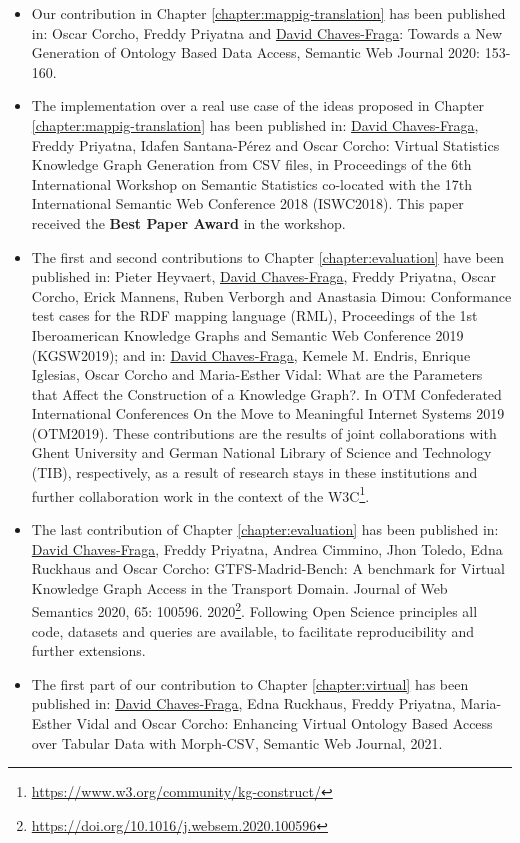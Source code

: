 \begin{itemize}
    \item Our contribution in Chapter \ref{chapter:mappig-translation} has been published in: Oscar Corcho, Freddy Priyatna and \underline{David Chaves-Fraga}: Towards a New Generation of Ontology Based Data Access, Semantic Web Journal 2020: 153-160.
    \item The implementation over a real use case of the ideas proposed in Chapter \ref{chapter:mappig-translation} has been published in: \underline{David Chaves-Fraga}, Freddy Priyatna, Idafen Santana-Pérez and Oscar Corcho: Virtual Statistics Knowledge Graph Generation from CSV files, in Proceedings of the 6th International Workshop on Semantic Statistics co-located with the 17th International Semantic Web Conference 2018 (ISWC2018). This paper received the \textbf{Best Paper Award} in the workshop.
    \item The first and second contributions to Chapter \ref{chapter:evaluation} have been published in: Pieter Heyvaert, \underline{David Chaves-Fraga}, Freddy Priyatna, Oscar Corcho, Erick Mannens, Ruben Verborgh and Anastasia Dimou: Conformance test cases for the RDF mapping language (RML), Proceedings of the 1st Iberoamerican Knowledge Graphs and Semantic Web Conference 2019 (KGSW2019); and in: \underline{David Chaves-Fraga}, Kemele M. Endris, Enrique Iglesias, Oscar Corcho and Maria-Esther Vidal: What are the Parameters that Affect the Construction of a Knowledge Graph?. In OTM Confederated International Conferences On the Move to Meaningful Internet Systems 2019 (OTM2019). These contributions are the results of joint collaborations with Ghent University and German National Library of Science and Technology (TIB), respectively, as a result of research stays in these institutions and further collaboration work in the context of the W3C\footnote{\url{https://www.w3.org/community/kg-construct/}}.
    \item The last contribution of Chapter \ref{chapter:evaluation} has been published in: \underline{David Chaves-Fraga}, Freddy Priyatna, Andrea Cimmino, Jhon Toledo, Edna Ruckhaus and Oscar Corcho: GTFS-Madrid-Bench: A benchmark for Virtual Knowledge Graph Access in the Transport Domain. Journal of Web Semantics 2020, 65: 100596. 2020\footnote{\url{https://doi.org/10.1016/j.websem.2020.100596}}. Following Open Science principles all code, datasets and queries are available, to facilitate reproducibility and further extensions.
    \item The first part of our contribution to Chapter \ref{chapter:virtual} has been published in: \underline{David Chaves-Fraga}, Edna Ruckhaus, Freddy Priyatna, Maria-Esther Vidal and Oscar Corcho: Enhancing Virtual Ontology Based Access over Tabular Data with Morph-CSV, Semantic Web Journal, 2021.

\end{itemize}
